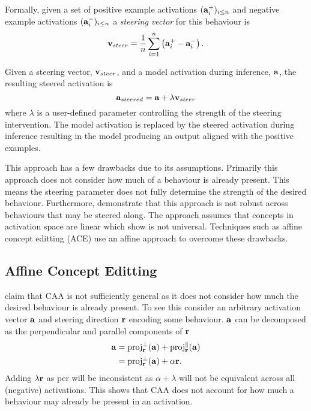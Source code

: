 Formally, given a set of positive example activations $(\mathbf{a}_i^+)_{i\le n}$ and negative example activations $(\mathbf{a}_i^-)_{i\le n}$ a \textit{steering vector} for this behaviour is
\[\mathbf{v}_{steer} = \frac{1}{n}\sum_{i=1}^{n}\left(\mathbf{a}_i^+ - \mathbf{a}_i^-\right).\]

Given a steering vector, $\mathbf{v}_{steer}$, and a model activation during inference, $\mathbf{a}$, the resulting steered activation is
\begin{equation}
    \label{eq:caa}
    \mathbf{a}_{steered} = \mathbf{a} + \lambda\mathbf{v}_{steer}
\end{equation}
where $\lambda$ is a user-defined parameter controlling the strength of the steering intervention.
The model activation is replaced by the steered activation during inference resulting in the model producing an output aligned with the positive examples.

This approach has a few drawbacks \citep{steerability, ace, non-linear-features} due to its assumptions.
Primarily this approach does not consider how much of a behaviour is already present.
This means the steering parameter does not fully determine the strength of the desired behaviour.
Furthermore, \citet{steerability} demonstrate that this approach is not robust across behaviours that may be steered along.
The approach assumes that concepts in activation space are linear which \citet{non-linear-features} show is not universal.
Techniques such as affine concept editting (ACE)  use an affine approach to overcome these drawbacks.

\subsection{Affine Concept Editting}
\label{ace}

\citet{ace} claim that CAA \citep{caa} is not sufficiently general as it does not consider how much the desired behaviour is already present.
To see this consider an arbitrary activation vector $\mathbf{a}$ and steering direction $\mathbf{r}$ encoding some behaviour.
$\mathbf{a}$ can be decomposed as the perpendicular and parallel components of $\mathbf{r}$
\begin{align*}
    \mathbf{a} &= \text{proj}_{\mathbf{r}}^{\perp}(\mathbf{a}) + \text{proj}_{\mathbf{r}}^{\parallel}(\mathbf{a}) \\
        &= \text{proj}_{\mathbf{r}}^{\perp}(\mathbf{a}) + \alpha\mathbf{r}.
\end{align*}
Adding $\lambda\mathbf{r}$ as per  will be inconsistent as $\alpha + \lambda$ will not be equivalent across all (negative) activations.
This shows that CAA \citep{caa} does not account for how much a behaviour may already be present in an activation.

